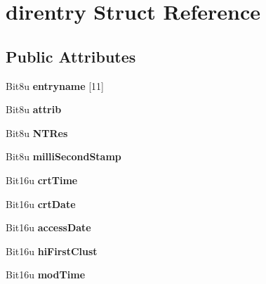 \hypertarget{structdirentry}{\section{direntry Struct Reference}
\label{structdirentry}
}
\subsection*{Public Attributes}
\begin{DoxyCompactItemize}
\item 
\hypertarget{structdirentry_a33bd45852f447ffb9a58a15da21483f8}{Bit8u {\bfseries entryname} \mbox{[}11\mbox{]}}\label{structdirentry_a33bd45852f447ffb9a58a15da21483f8}

\item 
\hypertarget{structdirentry_a78f47908031fc710787c914f5602fcd3}{Bit8u {\bfseries attrib}}\label{structdirentry_a78f47908031fc710787c914f5602fcd3}

\item 
\hypertarget{structdirentry_ab5c43cb970c4b88317a129aad6d6a38a}{Bit8u {\bfseries N\-T\-Res}}\label{structdirentry_ab5c43cb970c4b88317a129aad6d6a38a}

\item 
\hypertarget{structdirentry_a4180419ffeaa8fcdf7030f19f1f6c625}{Bit8u {\bfseries milli\-Second\-Stamp}}\label{structdirentry_a4180419ffeaa8fcdf7030f19f1f6c625}

\item 
\hypertarget{structdirentry_a9491863f6f25e30b104564ef7c7c0c87}{Bit16u {\bfseries crt\-Time}}\label{structdirentry_a9491863f6f25e30b104564ef7c7c0c87}

\item 
\hypertarget{structdirentry_ab5d73d8a099f479210261f4a991e5916}{Bit16u {\bfseries crt\-Date}}\label{structdirentry_ab5d73d8a099f479210261f4a991e5916}

\item 
\hypertarget{structdirentry_ada6390a10e12d5c74a7e717fa60dc9d3}{Bit16u {\bfseries access\-Date}}\label{structdirentry_ada6390a10e12d5c74a7e717fa60dc9d3}

\item 
\hypertarget{structdirentry_ac1a9ffbefedeb657c70f154ed8b566fe}{Bit16u {\bfseries hi\-First\-Clust}}\label{structdirentry_ac1a9ffbefedeb657c70f154ed8b566fe}

\item 
\hypertarget{structdirentry_a43b5bf5eab5e80779681d680e3f06b65}{Bit16u {\bfseries mod\-Time}}\label{structdirentry_a43b5bf5eab5e80779681d680e3f06b65}


\end{DoxyCompactItemize}
